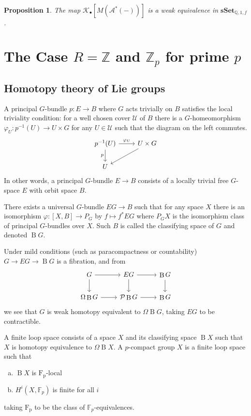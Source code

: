\documentclass[psamsfonts]{amsart}
\newtheorem{prop}[thm]{Proposition}
\theoremstyle{definition}
\theoremstyle{remark}
\newcommand{\Q}{\mathbb{Q}}
\newcommand{\Z}{\mathbb{Z}}
\newcommand{\F}{\mathbb{F}}
\newcommand{\sSet}{\mathbf{sSet}}
\DeclareMathOperator{\B}{B}
\numberwithin{equation}{section}
\begin{document}
\begin{prop}
The map $\mathcal{K}_\bullet[M(\mathcal{A}^\ast(-))]$ is a weak equivalence in ${\sSet_{\Q,1,f}}$.
\end{prop}

\newpage
\section{The Case $R=\Z$ and $\Z_p$ for prime $p$}

\subsection{Homotopy theory of Lie groups}

A principal $G$-bundle $p:E\to B$ where $G$ acts trivially on $B$ satisfies the local triviality condition: for a well chosen cover $\mathcal{U}$ of $B$ there is a $G$-homeomorphism $\varphi_U:p^{-1}(U)\to U\times G$ for any $U\in\mathcal{U}$ such that the diagram on the left commutes.
\[\begin{tikzcd}
p^{-1}(U)\arrow[d,"p"']\arrow[r,"\varphi_U"]&U\times G\arrow[dl]\\
U
\end{tikzcd}\]
In other words, a principal $G$-bundle $E\to B$ consists of a locally trivial free $G$-space $E$ with orbit space $B$.

There exists a universal $G$-bundle $EG\to B$ such that for any space $X$ there is an isomorphism $\varphi:[X,B]\to P_G$ by $f\mapsto f^\ast EG$ where $P_GX$ is the isomorphism class of principal $G$-bundles over $X$. Such $B$ is called the classifying space of $G$ and denoted $\B G$.

Under mild conditions (such as paracompactness or countability) $G\to EG\to\B G$ is a fibration, and from
\[\begin{tikzcd}
G\arrow[r]\arrow[d]&EG\arrow[r]\arrow[d]&\B G\arrow[d]\\
\Omega\B G\arrow[r]&\mathcal{P}\B G\arrow[r]&\B G
\end{tikzcd}\]
we see that $G$ is weak homotopy equivalent to $\Omega\B G$, taking $EG$ to be contractible.

A finite loop space consists of a space $X$ and its classifying space $\B X$ such that $X$ is homotopy equivalence to $\Omega\B X$. A $p$-compact group $X$ is a finite loop space such that\begin{enumerate}[(a)]
    \item $\B X$ is $\mathrm{F_p}$-local
    \item $H^i(X,\F_p)$ is finite for all $i$
\end{enumerate}
taking $\mathrm{F_p}$ to be the class of $\F_p$-equivalences.
\end{document}
